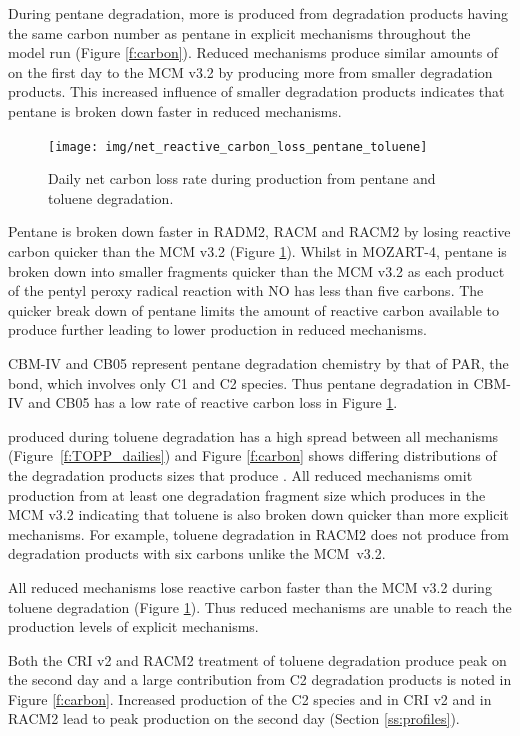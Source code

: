 During pentane degradation, more  is produced from degradation products having the same carbon number as pentane in explicit mechanisms throughout the model run (Figure \ref{f:carbon}).
Reduced mechanisms produce similar amounts of  on the first day to the MCM v3.2 by producing more  from smaller degradation products.
This increased influence of smaller degradation products indicates that pentane is broken down faster in reduced mechanisms.

\begin{figure}
    \centering
    \texttt{[image: img/net\_reactive\_carbon\_loss\_pentane\_toluene]}
    \vspace{0mm}
    \caption{Daily net carbon loss rate during  production from pentane and toluene degradation.}
    \vspace{-4mm}
    \label{f:net_carbon_loss}
\end{figure}

Pentane is broken down faster in RADM2, RACM and RACM2 by losing reactive carbon quicker than the MCM v3.2 (Figure \ref{f:net_carbon_loss}).
Whilst in MOZART-4, pentane is broken down into smaller fragments quicker than the MCM v3.2 as each product of the pentyl peroxy radical reaction with NO has less than five carbons.
The quicker break down of pentane limits the amount of reactive carbon available to produce further  leading to lower  production in reduced mechanisms.

CBM-IV and CB05 represent pentane degradation chemistry by that of PAR, the  bond, which involves only C1 and C2 species.
Thus pentane degradation in CBM-IV and CB05 has a low rate of reactive carbon loss in Figure \ref{f:net_carbon_loss}.

 produced during toluene degradation has a high spread between all mechanisms \mbox{(Figure \ref{f:TOPP_dailies})} and Figure \ref{f:carbon} shows differing distributions of the degradation products sizes that produce .
All reduced mechanisms omit  production from at least one degradation fragment size which produces  in the MCM v3.2 indicating that toluene is also broken down quicker than more explicit mechanisms.
For example, toluene degradation in RACM2 does not produce  from degradation products with six carbons unlike the \mbox{MCM v3.2}.

All reduced mechanisms lose reactive carbon faster than the MCM v3.2 during toluene degradation (Figure \ref{f:net_carbon_loss}).
Thus reduced mechanisms are unable to reach the  production levels of explicit mechanisms.

Both the CRI v2 and RACM2 treatment of toluene degradation produce peak  on the second day and a large contribution from C2 degradation products is noted in Figure \ref{f:carbon}.
Increased  production of the C2 species  and  in CRI v2 and  in RACM2 lead to peak  production on the second day (Section \ref{ss:profiles}).
